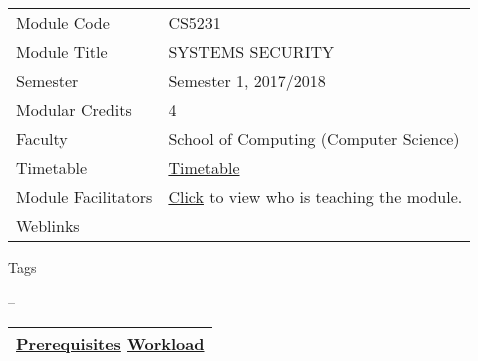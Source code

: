 \hypertarget{ctl00_ctl00_ContentPlaceHolder1_ContentPlaceHolder1_LV_itemPlaceholderContainer}{}
\begin{longtable}[]{@{}ll@{}}
\toprule
\protect\hypertarget{ctl00_ctl00_ContentPlaceHolder1_ContentPlaceHolder1_LV_ctrl0_txtCode}{}{Module
Code} &
\protect\hypertarget{ctl00_ctl00_ContentPlaceHolder1_ContentPlaceHolder1_LV_ctrl0_lcCode}{}{CS5231}\tabularnewline
\protect\hypertarget{ctl00_ctl00_ContentPlaceHolder1_ContentPlaceHolder1_LV_ctrl0_lcCourse}{}{Module
Title} &
\protect\hypertarget{ctl00_ctl00_ContentPlaceHolder1_ContentPlaceHolder1_LV_ctrl0_lcCourseName}{}{SYSTEMS
SECURITY}\tabularnewline
\protect\hypertarget{ctl00_ctl00_ContentPlaceHolder1_ContentPlaceHolder1_LV_ctrl0_lcSemester}{}{Semester}
&
\protect\hypertarget{ctl00_ctl00_ContentPlaceHolder1_ContentPlaceHolder1_LV_ctrl0_lcSem}{}{Semester
1, 2017/2018}\tabularnewline
\protect\hypertarget{ctl00_ctl00_ContentPlaceHolder1_ContentPlaceHolder1_LV_ctrl0_lcModCredit}{}{Modular
Credits} &
\protect\hypertarget{ctl00_ctl00_ContentPlaceHolder1_ContentPlaceHolder1_LV_ctrl0_lcModC}{}{4}\tabularnewline
\protect\hypertarget{ctl00_ctl00_ContentPlaceHolder1_ContentPlaceHolder1_LV_ctrl0_lcFaculty}{}{Faculty}
&
\protect\hypertarget{ctl00_ctl00_ContentPlaceHolder1_ContentPlaceHolder1_LV_ctrl0_lcFac}{}{School
of Computing (Computer Science)}\tabularnewline
\protect\hypertarget{ctl00_ctl00_ContentPlaceHolder1_ContentPlaceHolder1_LV_ctrl0_Label1}{}{Timetable}
&
\protect\hypertarget{ctl00_ctl00_ContentPlaceHolder1_ContentPlaceHolder1_LV_ctrl0_Span1}{}{\href{javascript:void(0);}{Timetable}}\tabularnewline
\protect\hypertarget{ctl00_ctl00_ContentPlaceHolder1_ContentPlaceHolder1_LV_ctrl0_Label6}{}{Module
Facilitators} &
\protect\hypertarget{ctl00_ctl00_ContentPlaceHolder1_ContentPlaceHolder1_LV_ctrl0_Span2}{}{\href{list_lecturers.aspx?CourseID=5ce9cfc8-7723-4eb2-b778-d47665e247db\&ClickFrom=}{Click}
to view who is teaching the module.}\tabularnewline
\protect\hypertarget{ctl00_ctl00_ContentPlaceHolder1_ContentPlaceHolder1_LV_ctrl0_LabelCtrl1}{}{Weblinks}
&\tabularnewline
\bottomrule
\end{longtable}

\protect\hypertarget{ctl00_ctl00_ContentPlaceHolder1_ContentPlaceHolder1_LV_ctrl0_Label4}{}{Tags}

\protect\hypertarget{ctl00_ctl00_ContentPlaceHolder1_ContentPlaceHolder1_LV_ctrl0_lblTags}{}{--}

\begin{longtable}[]{@{}l@{}}
\toprule
\protect\hypertarget{ctl00_ctl00_ContentPlaceHolder1_ContentPlaceHolder1_lblSectionMiddle}{}{\protect\hyperlink{Prerequisites}{Prerequisites}
\textbar{} \protect\hyperlink{Workload}{Workload}}\tabularnewline
\bottomrule
\end{longtable}


